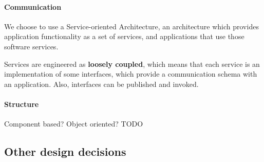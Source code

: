\paragraph{Communication} We choose to use a Service-oriented Architecture, 
an architecture which provides application functionality as a set of services, 
and applications that use those software services. 

Services are engineered as \textbf{loosely coupled}, which means that each service
is an implementation of some interfaces, which provide a communication schema with
an application.
Also, interfaces can be published and invoked.

\paragraph{Structure} Component based? Object oriented? TODO

\subsection{Other design decisions}
